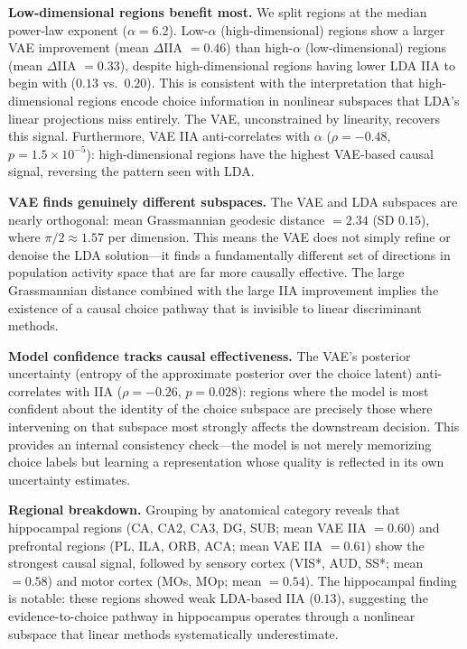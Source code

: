 \documentclass{article}
\begin{document}
\textbf{Low-dimensional regions benefit most.} We split regions at the median power-law exponent ($\alpha = 6.2$). Low-$\alpha$ (high-dimensional) regions show a larger VAE improvement (mean $\Delta$IIA $= 0.46$) than high-$\alpha$ (low-dimensional) regions (mean $\Delta$IIA $= 0.33$), despite high-dimensional regions having lower LDA IIA to begin with ($0.13$ vs.\ $0.20$). This is consistent with the interpretation that high-dimensional regions encode choice information in nonlinear subspaces that LDA's linear projections miss entirely. The VAE, unconstrained by linearity, recovers this signal. Furthermore, VAE IIA anti-correlates with $\alpha$ ($\rho = -0.48$, $p = 1.5 \times 10^{-5}$): high-dimensional regions have the highest VAE-based causal signal, reversing the pattern seen with LDA.

\textbf{VAE finds genuinely different subspaces.} The VAE and LDA subspaces are nearly orthogonal: mean Grassmannian geodesic distance $= 2.34$ (SD $0.15$), where $\pi/2 \approx 1.57$ per dimension. This means the VAE does not simply refine or denoise the LDA solution---it finds a fundamentally different set of directions in population activity space that are far more causally effective. The large Grassmannian distance combined with the large IIA improvement implies the existence of a causal choice pathway that is invisible to linear discriminant methods.

\textbf{Model confidence tracks causal effectiveness.} The VAE's posterior uncertainty (entropy of the approximate posterior over the choice latent) anti-correlates with IIA ($\rho = -0.26$, $p = 0.028$): regions where the model is most confident about the identity of the choice subspace are precisely those where intervening on that subspace most strongly affects the downstream decision. This provides an internal consistency check---the model is not merely memorizing choice labels but learning a representation whose quality is reflected in its own uncertainty estimates.

\textbf{Regional breakdown.} Grouping by anatomical category reveals that hippocampal regions (CA, CA2, CA3, DG, SUB; mean VAE IIA $= 0.60$) and prefrontal regions (PL, ILA, ORB, ACA; mean VAE IIA $= 0.61$) show the strongest causal signal, followed by sensory cortex (VIS*, AUD, SS*; mean $= 0.58$) and motor cortex (MOs, MOp; mean $= 0.54$). The hippocampal finding is notable: these regions showed weak LDA-based IIA ($0.13$), suggesting the evidence-to-choice pathway in hippocampus operates through a nonlinear subspace that linear methods systematically underestimate.
\end{document}
